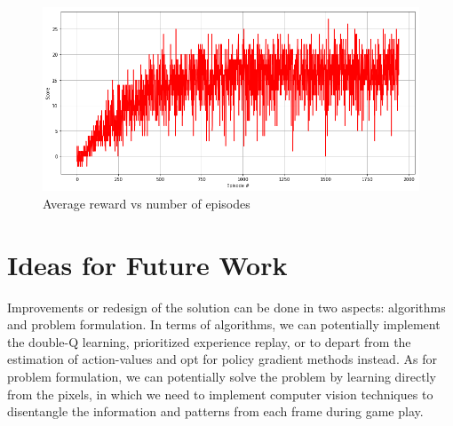 \documentclass[12pt,twoside]{article}
\begin{document}
	
\begin{figure}[H]
	\begin{center}
		\includegraphics[width = 1\hsize]{./figures/Rewards.png} 
		\caption{Average reward vs number of episodes} %
		\label{fig:rewards} %
	\end{center}
\end{figure}


\section{Ideas for Future Work}
Improvements or redesign of the solution can be done in two aspects: algorithms and problem formulation. In terms of algorithms, we can potentially implement the double-Q learning, prioritized experience replay, or to depart from the estimation of action-values and opt for policy gradient methods instead. As for problem formulation, we can potentially solve the problem by learning directly from the pixels, in which we need to implement computer vision techniques to disentangle the information and patterns from each frame during game play. 	
\end{document}
